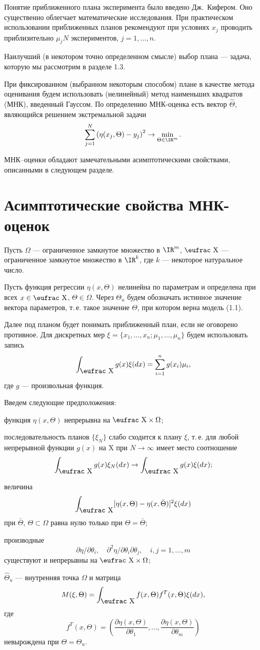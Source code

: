 Понятие приближенного плана эксперимента было введено Дж.\, Кифером.
Оно существенно облегчает математические исследования. При
практическом использовании приближенных планов рекомендуют при
условиях $x_j$ проводить приблизительно $\mu_jN$ экспериментов,
$j=1,\ldots,n$.

Наилучший (в некотором точно определенном смысле) выбор плана ---
задача, которую мы рассмотрим в разделе 1.3.

При фиксированном (выбранном некоторым способом) плане в качестве
метода оценивания будем использовать (нелинейный) метод наименьших
квадратов (МНК), введенный Гауссом. По определению МНК-оценка есть
вектор $\hat\Theta$, являющийся решением экстремальной задачи
$$
\sum^N_{j=1}\left(\eta(x_j,\Theta)-y_j\right)^2\to
\min_{\Theta\in{\IR}^m}.
$$

МНК--оценки обладают замечательными асимптотическими свойствами,
описанными в следующем разделе.


\section{\bf Асимптотические свойства МНК-оценок}

Пусть $\Omega$ --- ограниченное замкнутое множество в ${\IR}^m$,
${\mbox{\eufrac X}}$ --- ограниченное замкнутое множество в
${\IR}^k$, где $k$ --- некоторое натуральное число.

Пусть функция регрессии $\eta(x,\Theta)$ нелинейна по параметрам и
определена при всех $x\in{\mbox{\eufrac X}}$, $\Theta\in\Omega$.
Через $\Theta_u$ будем обозначать истинное значение вектора
параметров, т.\,е. такое значение $\Theta$, при котором верна модель
(1.1).

Далее под планом будет понимать приближенный план, если не оговорено
противное. Для дискретных мер
$\xi=\{x_1,\ldots,x_n;\mu_1,\ldots,\mu_n\}$ будем использовать
запись
$$
\int_{\mbox{\eufrac X}} g(x)\xi(dx)=\sum^n_{i=1}g(x_i)\mu_i,
$$
где $g$ --- произвольная функция.

Введем следующие предположения: \bi
\item[a)] функция $\eta(x,\Theta)$ непрерывна на ${\mbox{\eufrac X}}\times\Omega$;
\item[б)] последовательность планов $\{\xi_N\}$ слабо сходится к плану $\xi$,
т.\,е. для любой непрерывной функции $g(x)$ на {\eufrac X} при
$N\to\infty$ имеет место соотношение
$$
\int_{\mbox{\eufrac X}} g(x)\xi_N(dx)\to \int_{\mbox{\eufrac X}}
g(x)\xi(dx);
$$
\item[в)] величина
$$
\int_{\mbox{\eufrac X}} [\eta(x,\Theta)-\eta(x,\bar\Theta)]^2\xi(dx)
$$
при $\bar\Theta$, $\Theta\subset\Omega$ равна нулю только при
$\Theta=\bar\Theta$;
\item[г)] производные
$$
\partial\eta/\partial\theta_i,\quad \partial^2\eta/\partial\theta_i
\partial\theta_j,\quad i,j=1,\ldots,m
$$
существуют и непрерывны на ${\mbox{\eufrac X}}\times\Omega$;
\item[д)] $\hat\Theta_u$ --- внутренняя точка $\Omega$ и матрица
$$
M(\xi,\Theta)=\int_{\mbox{\eufrac X}}
f(x,\Theta)f^T(x,\Theta)\xi(dx),
$$
где
$$
f^T(x,\Theta)=\left(\frac{\partial\eta(x,\Theta)}{\partial\theta_1},\ldots,
\frac{\partial\eta(x,\Theta)}{\partial\theta_m}\right)
$$
невырождена при $\Theta=\Theta_u$. \ei

